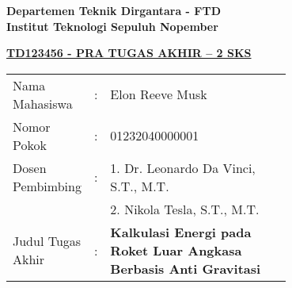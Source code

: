 \begin{flushleft}
  \textbf{Departemen Teknik Dirgantara - FTD}\\
  \textbf{Institut Teknologi Sepuluh Nopember}\\
\end{flushleft}
\begin{center}
  \underline{\textbf{TD123456 - PRA TUGAS AKHIR – 2 SKS}}
\end{center}

\begin{adjustwidth}{-0.2cm}{}
  \begin{tabular}{lcp{0.7\linewidth}}
    Nama Mahasiswa &:& Elon Reeve Musk \\
    Nomor Pokok &:&	01232040000001 \\
    Dosen Pembimbing &:& 1. Dr. Leonardo Da Vinci, S.T., M.T. \\
    & & 2. Nikola Tesla, S.T., M.T. \\
    Judul Tugas Akhir &:& \textbf{Kalkulasi Energi pada Roket Luar Angkasa Berbasis Anti Gravitasi} \\
  \end{tabular}
\end{adjustwidth}
\vspace{2ex}

\lipsum[1]
\vspace{2ex}
